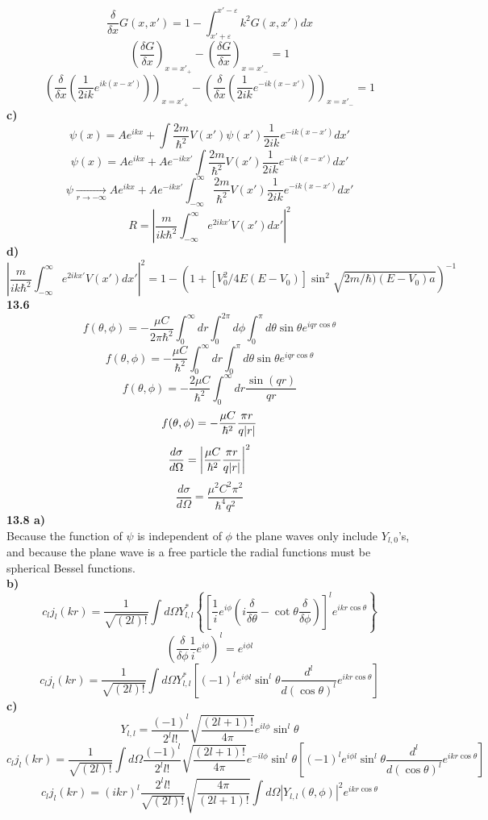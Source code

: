 \documentclass[english]{article}
\begin{document}
$$\frac{\delta}{\delta x}G(x,x')=1-\int_{x'+\varepsilon}^{x'-\varepsilon}k^2G(x,x')dx$$
$$\left(\frac{\delta G}{\delta x}\right)_{x=x'_+}-\left(\frac{\delta G}{\delta x}\right)_{x=x'_-}=1$$
$$\left(\frac{\delta}{\delta x}\left(\frac{1}{2ik}e^{ik(x-x')}\right)\right)_{x=x'_+}-\left(\frac{\delta}{\delta x}\left(\frac{1}{2ik}e^{-ik(x-x')}\right)\right)_{x=x'_-}=1$$
\textbf{c)}
$$\psi(x)=Ae^{ikx}+\int \frac{2m}{\hbar^2}V(x')\psi(x')\frac{1}{2ik}e^{-ik(x-x')}dx'$$
$$\psi(x)=Ae^{ikx}+Ae^{-ikx'}\int \frac{2m}{\hbar^2}V(x')\frac{1}{2ik}e^{-ik(x-x')}dx'$$
$$\psi\xrightarrow[r\rightarrow-\infty]{}Ae^{ikx}+Ae^{-ikx'}\int_{-\infty}^{\infty} \frac{2m}{\hbar^2}V(x')\frac{1}{2ik}e^{-ik(x-x')}dx'$$
$$R=\left|\frac{m}{ik\hbar^2}\int_{-\infty}^{\infty}e^{2ikx'}V(x')dx'\right|^2$$
\textbf{d)}
$$\left|\frac{m}{ik\hbar^2}\int_{-\infty}^{\infty}e^{2ikx'}V(x')dx'\right|^2=1-\left(1+\left[V_0^2/4E(E-V_0)\right]\sin^2\sqrt{2m/\hbar)(E-V_0)a}\right)^{-1}$$
\textbf{13.6}
$$f(\theta,\phi)=-\frac{\mu C}{2\pi\hbar^2}\int_0^{\infty}dr\int_0^{2\pi}d\phi\int_0^{\pi} d\theta\sin\theta e^{iqr\cos\theta}$$
$$f(\theta,\phi)=-\frac{\mu C}{\hbar^2}\int_0^{\infty}dr\int_0^{\pi} d\theta\sin\theta e^{iqr\cos\theta}$$
$$f(\theta,\phi)=-\frac{2\mu C}{\hbar^2}\int_0^{\infty}dr\frac{\sin(qr)}{qr}$$
$$f(\theta,\phi)=-\frac{\mu C}{\hbar^2}\frac{\pi r}{q\abs{r}}$$
$$\frac{d\sigma}{d\Omega}=\left|\frac{\mu C}{\hbar^2}\frac{\pi r}{q\abs{r}}\right|^2$$
$$\frac{d\sigma}{d\Omega}=\frac{\mu^2 C^2\pi^2}{\hbar^4q^2}$$
\textbf{13.8 a)}\\
Because the function of $\psi$ is independent of $\phi$ the plane waves only include $Y_{l,0}$'s, and because the plane wave is a free particle the radial functions must be spherical Bessel functions.\\
\textbf{b)}
$$c_lj_l(kr)=\frac{1}{\sqrt{(2l)!}}\int d\Omega Y^{*}_{l,l}\left\{\left[\frac{1}{i}e^{i\phi}\left(i\frac{\delta}{\delta\theta}-\cot\theta\frac{\delta}{\delta\phi}\right)\right]^le^{ikr\cos\theta}\right\}$$ 
$$\left(\frac{\delta}{\delta\phi}\frac{1}{i}e^{i\phi}\right)^l=e^{i\phi l}$$
$$c_lj_l(kr)=\frac{1}{\sqrt{(2l)!}}\int d\Omega Y^{*}_{l,l}\left[(-1)^le^{i\phi l}\sin^l\theta\frac{d^l}{d(\cos\theta)^l}e^{ikr\cos\theta}\right]$$
\textbf{c)}
$$Y_{l,l}=\frac{(-1)^l}{2^ll!}\sqrt{\frac{(2l+1)!}{4\pi}}e^{il\phi}\sin^l\theta$$
$$c_lj_l(kr)=\frac{1}{\sqrt{(2l)!}}\int d\Omega \frac{(-1)^l}{2^ll!}\sqrt{\frac{(2l+1)!}{4\pi}}e^{-il\phi}\sin^l\theta\left[(-1)^le^{i\phi l}\sin^l\theta\frac{d^l}{d(\cos\theta)^l}e^{ikr\cos\theta}\right]$$
$$c_lj_l(kr)=(ikr)^l\frac{2^ll!}{\sqrt{(2l)!}}\sqrt{\frac{4\pi}{(2l+1)!}}\int d\Omega\left|Y_{l,l}(\theta,\phi)\right|^2e^{ikr\cos\theta}$$
\end{document}
